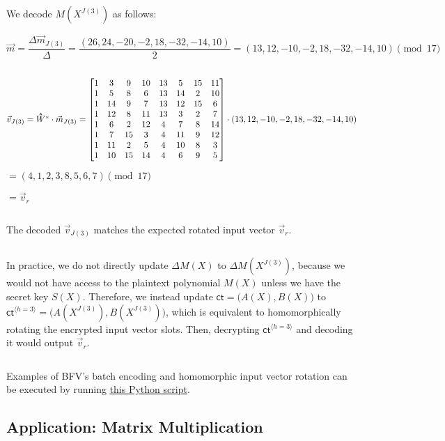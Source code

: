 We decode $M(X^{J(3)})$ as follows: 

$\vec{m} = \dfrac{\Delta \vec{m}_{J(3)}}{\Delta} = \dfrac{(26, 24, -20, -2, 18, -32, -14, 10)}{2} = (13, 12, -10, -2, 18, -32, -14, 10) \pmod{17}$

$ $


$\vec{v}_{J(3)} = \hathat W^* \cdot \vec{m}_{J(3)} = \begin{bmatrix}
1&3&9&10&13&5&15&11\\
1&5&8&6&13&14&2&10\\
1&14&9&7&13&12&15&6\\
1&12&8&11&13&3&2&7\\
1&6&2&12&4&7&8&14\\
1&7&15&3&4&11&9&12\\
1&11&2&5&4&10&8&3\\
1&10&15&14&4&6&9&5\\
\end{bmatrix} \cdot (13, 12, -10, -2, 18, -32, -14, 10) $

$= (4, 1, 2, 3, 8, 5, 6, 7) \pmod{17}$

$= \vec{v}_r$

$ $

The decoded $\vec{v}_{J(3)}$ matches the expected rotated input vector $\vec{v}_r$.  


$ $

In practice, we do not directly update $\Delta M(X)$ to $\Delta M(X^{J(3)})$, because we would not have access to the plaintext polynomial $M(X)$ unless we have the secret key $S(X)$. Therefore, we instead update $\textsf{ct}=\bm(A(X), B(X)\bm)$ to $\textsf{ct}^{\langle h=3 \rangle}=\bm(A(X^{J(3)}), B(X^{J(3)})\bm)$, which is equivalent to homomorphically rotating the encrypted input vector slots. Then, decrypting $\textsf{ct}^{\langle h=3 \rangle}$ and decoding it would output $\vec{v}_r$.

$ $




 Examples of BFV's batch encoding and homomorphic input vector rotation can be executed by running \href{https://github.com/gogo9th/fhe-textbook/blob/main/soruce%20code/bfv.py}{\underline{this Python script}}. 



\subsection{Application: Matrix Multiplication}
\label{subsec:bfv-matrix-multiplication}

